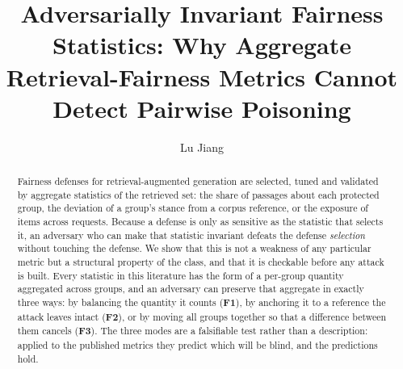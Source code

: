 \documentclass[authoryear,review,3p,times]{elsarticle}
\begin{document}
\title{Adversarially Invariant Fairness Statistics: Why Aggregate Retrieval-Fairness Metrics Cannot Detect Pairwise Poisoning}
\author[njust]{Lu Jiang}
\date{}
\maketitle



\begin{abstract}
Fairness defenses for retrieval-augmented generation are selected, tuned and validated by aggregate statistics of the retrieved set: the share of passages about each protected group, the deviation of a group's stance from a corpus reference, or the exposure of items across requests. Because a defense is only as sensitive as the statistic that selects it, an adversary who can make that statistic invariant defeats the defense \emph{selection} without touching the defense. We show that this is not a weakness of any particular metric but a structural property of the class, and that it is checkable before any attack is built. Every statistic in this literature has the form of a per-group quantity aggregated across groups, and an adversary can preserve that aggregate in exactly three ways: by balancing the quantity it counts (\textbf{F1}), by anchoring it to a reference the attack leaves intact (\textbf{F2}), or by moving all groups together so that a difference between them cancels (\textbf{F3}). The three modes are a falsifiable test rather than a description: applied to the published metrics they predict which will be blind, and the predictions hold.


\end{abstract}
\end{document}
